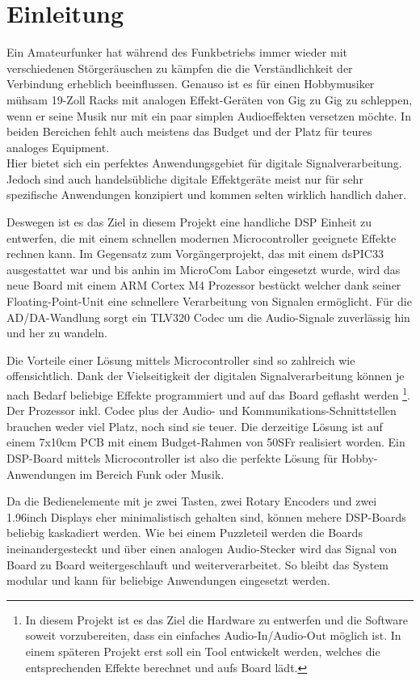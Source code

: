 \section{Einleitung}
\label{sec:Einleitung}

Ein Amateurfunker hat während des Funkbetriebs immer wieder mit verschiedenen Störgeräuschen zu kämpfen die die Verständlichkeit der Verbindung erheblich beeinflussen. Genauso ist es für einen Hobbymusiker mühsam 19-Zoll Racks mit analogen Effekt-Geräten von Gig zu Gig zu schleppen, wenn er seine Musik nur mit ein paar simplen Audioeffekten versetzen möchte. In beiden Bereichen fehlt auch meistens das Budget und der Platz für teures analoges Equipment.\\
Hier bietet sich ein perfektes Anwendungsgebiet für digitale Signalverarbeitung. Jedoch sind auch handelsübliche digitale Effektgeräte meist nur für sehr spezifische Anwendungen konzipiert und kommen selten wirklich handlich daher.

Deswegen ist es das Ziel in diesem Projekt eine handliche DSP Einheit zu entwerfen, die mit einem schnellen modernen Microcontroller geeignete Effekte rechnen kann. Im Gegensatz zum Vorgängerprojekt, das mit einem dsPIC33 ausgestattet war und bis anhin im MicroCom Labor eingesetzt wurde, wird das neue Board mit einem ARM Cortex M4 Prozessor bestückt welcher dank seiner Floating-Point-Unit eine schnellere Verarbeitung von Signalen ermöglicht. Für die AD/DA-Wandlung sorgt ein TLV320 Codec um die Audio-Signale zuverlässig hin und her zu wandeln.

Die Vorteile einer Lösung  mittels Microcontroller sind so zahlreich wie offensichtlich. Dank der Vielseitigkeit der digitalen Signalverarbeitung können je nach Bedarf beliebige Effekte programmiert und auf das Board geflasht werden \footnote{In diesem Projekt ist es das Ziel die Hardware zu entwerfen und die Software soweit vorzubereiten, dass ein einfaches Audio-In/Audio-Out möglich ist. In einem späteren Projekt erst soll ein Tool entwickelt werden, welches die entsprechenden Effekte berechnet und aufs Board lädt.}. Der Prozessor inkl. Codec plus der Audio- und Kommunikations-Schnittstellen brauchen weder viel Platz, noch sind sie teuer. Die derzeitige Lösung ist auf einem 7x10cm PCB mit einem Budget-Rahmen von 50SFr realisiert worden. Ein DSP-Board mittels Microcontroller ist also die perfekte Lösung für Hobby-Anwendungen im Bereich Funk oder Musik.

Da die Bedienelemente mit je zwei Tasten, zwei Rotary Encoders und zwei 1.96inch Displays eher minimalistisch gehalten sind, können mehere DSP-Boards beliebig kaskadiert werden. Wie bei einem Puzzleteil werden die Boards ineinandergesteckt und über einen analogen Audio-Stecker wird das Signal von Board zu Board weitergeschlauft und weiterverarbeitet. So bleibt das System modular und kann für beliebige Anwendungen eingesetzt werden.

